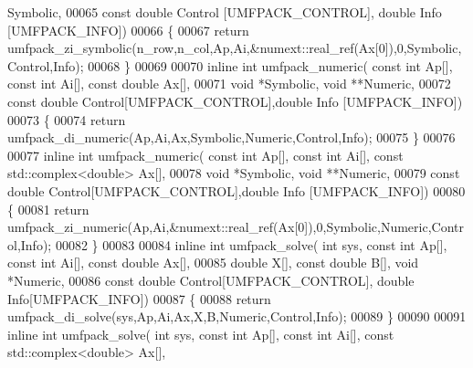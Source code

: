 \begin{DoxyCode}
      Symbolic,
00065                             \textcolor{keyword}{const} \textcolor{keywordtype}{double} Control [UMFPACK\_CONTROL], \textcolor{keywordtype}{double} Info [UMFPACK\_INFO])
00066 \{
00067   \textcolor{keywordflow}{return} umfpack\_zi\_symbolic(n\_row,n\_col,Ap,Ai,&numext::real\_ref(Ax[0]),0,Symbolic,Control,Info);
00068 \}
00069 
00070 \textcolor{keyword}{inline} \textcolor{keywordtype}{int} umfpack\_numeric( \textcolor{keyword}{const} \textcolor{keywordtype}{int} Ap[], \textcolor{keyword}{const} \textcolor{keywordtype}{int} Ai[], \textcolor{keyword}{const} \textcolor{keywordtype}{double} Ax[],
00071                             \textcolor{keywordtype}{void} *Symbolic, \textcolor{keywordtype}{void} **Numeric,
00072                             \textcolor{keyword}{const} \textcolor{keywordtype}{double} Control[UMFPACK\_CONTROL],\textcolor{keywordtype}{double} Info [UMFPACK\_INFO])
00073 \{
00074   \textcolor{keywordflow}{return} umfpack\_di\_numeric(Ap,Ai,Ax,Symbolic,Numeric,Control,Info);
00075 \}
00076 
00077 \textcolor{keyword}{inline} \textcolor{keywordtype}{int} umfpack\_numeric( \textcolor{keyword}{const} \textcolor{keywordtype}{int} Ap[], \textcolor{keyword}{const} \textcolor{keywordtype}{int} Ai[], \textcolor{keyword}{const} std::complex<double> Ax[],
00078                             \textcolor{keywordtype}{void} *Symbolic, \textcolor{keywordtype}{void} **Numeric,
00079                             \textcolor{keyword}{const} \textcolor{keywordtype}{double} Control[UMFPACK\_CONTROL],\textcolor{keywordtype}{double} Info [UMFPACK\_INFO])
00080 \{
00081   \textcolor{keywordflow}{return} umfpack\_zi\_numeric(Ap,Ai,&numext::real\_ref(Ax[0]),0,Symbolic,Numeric,Control,Info);
00082 \}
00083 
00084 \textcolor{keyword}{inline} \textcolor{keywordtype}{int} umfpack\_solve( \textcolor{keywordtype}{int} sys, \textcolor{keyword}{const} \textcolor{keywordtype}{int} Ap[], \textcolor{keyword}{const} \textcolor{keywordtype}{int} Ai[], \textcolor{keyword}{const} \textcolor{keywordtype}{double} Ax[],
00085                           \textcolor{keywordtype}{double} X[], \textcolor{keyword}{const} \textcolor{keywordtype}{double} B[], \textcolor{keywordtype}{void} *Numeric,
00086                           \textcolor{keyword}{const} \textcolor{keywordtype}{double} Control[UMFPACK\_CONTROL], \textcolor{keywordtype}{double} Info[UMFPACK\_INFO])
00087 \{
00088   \textcolor{keywordflow}{return} umfpack\_di\_solve(sys,Ap,Ai,Ax,X,B,Numeric,Control,Info);
00089 \}
00090 
00091 \textcolor{keyword}{inline} \textcolor{keywordtype}{int} umfpack\_solve( \textcolor{keywordtype}{int} sys, \textcolor{keyword}{const} \textcolor{keywordtype}{int} Ap[], \textcolor{keyword}{const} \textcolor{keywordtype}{int} Ai[], \textcolor{keyword}{const} std::complex<double> Ax[],

\end{DoxyCode}
